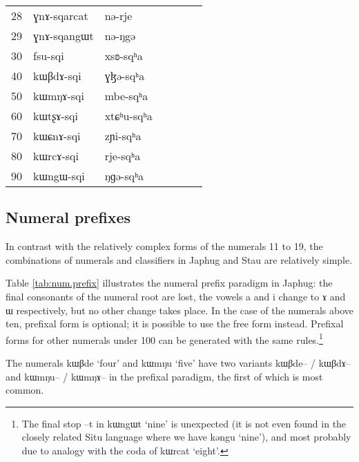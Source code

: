 \documentclass[oldfontcommands,oneside,a4paper,12pt]{article}
\newcommand{\ipa}[1]{{\phon#1}}
\begin{document}
\begin{table}[H]
\begin{tabular}{lllllll}
28	&	\ipa{ɣnɤ-sqarcat}  &	\ipa{nə-rje}  &	\\	
29	&	\ipa{ɣnɤ-sqangɯt}  &	\ipa{nə-ŋgə}  &	\\	
\midrule					
30	&	\ipa{fsu-sqi}  &	\ipa{xsʚ-sqʰa}  &	\\	
40	&	\ipa{kɯβdɤ-sqi}  &	\ipa{ɣɮə-sqʰa}  &	\\	
50	&	\ipa{kɯmŋɤ-sqi}  &	\ipa{mbe-sqʰa}  &	\\	
60	&	\ipa{kɯtʂɤ-sqi}  &	\ipa{xtɕʰu-sqʰa}  &	\\	
70	&	\ipa{kɯɕnɤ-sqi}  &	\ipa{zɲi-sqʰa}  &	\\	
80	&	\ipa{kɯrcɤ-sqi}  &	\ipa{rje-sqʰa}  &	\\	
90	&	\ipa{kɯngɯ-sqi}  &	\ipa{ŋɡə-sqʰa}  &	\\	
\bottomrule
\end{tabular}
\end{table}
		


 \subsection{Numeral prefixes} \label{sec:prefixes.japhug}
 
 In contrast with the relatively complex forms of the numerals 11 to 19, the combinations of numerals and classifiers in Japhug and Stau are relatively simple. 
 
Table \ref{tab:num.prefix} illustrates the numeral prefix paradigm in Japhug: the final consonants of the numeral root are lost, the vowels \ipa{a} and \ipa{i} change to \ipa{ɤ} and \ipa{ɯ} respectively, but no other change takes place. In the case of the numerals above ten, prefixal form is optional; it is possible to use the free form instead. Prefixal forms for other numerals under 100 can be generated with the same rules.\footnote{The final stop \ipa{--t} in \ipa{kɯngɯt} `nine' is unexpected (it is not even found in the closely related Situ language where we have \ipa{kəngu} `nine'), and most probably due to analogy with the coda of \ipa{kɯrcat}  `eight'. }
 
The numerals 	\ipa{kɯβde}  `four'   and \ipa{kɯmŋu} `five' have two variants \ipa{ kɯβde-- / kɯβdɤ--} and \ipa{ kɯmŋu-- / kɯmŋɤ--} in the prefixal paradigm, the first of which is most common.
 
\end{document}
